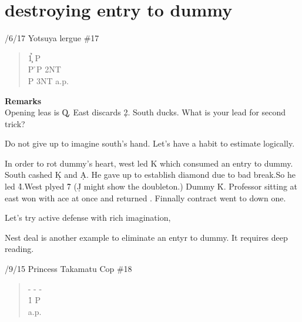 \section{destroying entry to dummy}

/6/17 Yotsuya lergue \#17
\begin{quote}
%
  {}%
  {}
  {}%
  {}%
\end{quote}
\begin{quote}
\begin{bidding}
1\c  {}\h \> P \d\\
P \h \>P \> 2NT \\
P \> 3NT \> a.p.
\end{bidding}
 \end{quote}

{\bf Remarks}\\

Opening leas is \c Q. East discards \d 2. South ducks.
What is your lead for second trick?

Do not give up to imagine south's hand.
Let's have a habit to estimate logically.

In order to rot dummy's heart, west led \s K which
consumed an entry to dummy. South cashed \d K and \d A.
He gave up to establish diamond due to bad break.So he led
\h 4.West plyed \h 7 (\d J might show the doubleton.)
Dummy \h K. Professor sitting at east won with ace at once
and returned . Finnally contract went to down one.

Let's try active defense with rich imagination,

Nest deal is another example to eliminate an entyr to
dummy. It requires deep reading.

\vspace{0.5cm}

/9/15 Princess Takamatu Cop \#18
\begin{quote}
%
  {}%
  {}
  {}%
  {}%
\end{quote}
\begin{quote}
\begin{bidding}
- \> -  \> - \h  \\
1\s  {}\h \> P \h\\
a.p.
\end{bidding}
 \end{quote}

